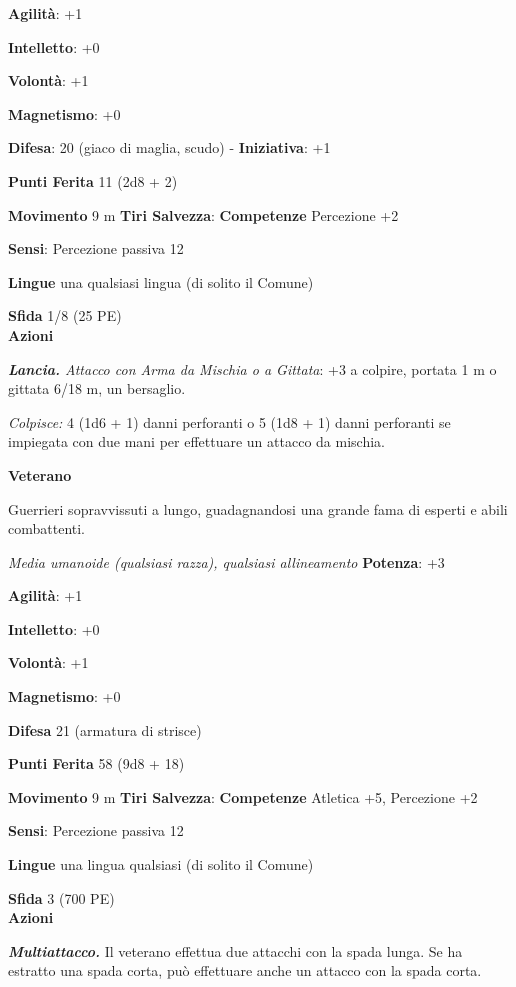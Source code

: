 \begin{multicols}{2}
\textbf{Agilità}: +1

\textbf{Intelletto}: +0

\textbf{Volontà}: +1

\textbf{Magnetismo}: +0

\textbf{Difesa}: 20 (giaco di maglia, scudo) - \textbf{Iniziativa}: +1

\textbf{Punti Ferita} 11 (2d8 + 2)

\textbf{Movimento} 9 m
\textbf{Tiri Salvezza}:
\textbf{Competenze} Percezione +2

\textbf{Sensi}: Percezione passiva 12

\textbf{Lingue} una qualsiasi lingua (di solito il Comune)

\textbf{Sfida} 1/8 (25 PE)\smallskip\\

\smallskip\textbf{Azioni}

\emph{\textbf{Lancia.} Attacco con Arma da Mischia o a Gittata}: +3 a
colpire, portata 1 m o gittata 6/18 m, un bersaglio.

\emph{Colpisce:} 4 (1d6 + 1) danni perforanti o 5 (1d8 + 1) danni
perforanti se impiegata con due mani per effettuare un attacco da
mischia.

\textbf{Veterano}

Guerrieri sopravvissuti a lungo, guadagnandosi una grande fama di
esperti e abili combattenti.

\emph{Media umanoide (qualsiasi razza), qualsiasi allineamento}
\textbf{Potenza}: +3

\textbf{Agilità}: +1

\textbf{Intelletto}: +0

\textbf{Volontà}: +1

\textbf{Magnetismo}: +0

\textbf{Difesa} 21 (armatura di strisce)

\textbf{Punti Ferita} 58 (9d8 + 18)

\textbf{Movimento} 9 m
\textbf{Tiri Salvezza}:
\textbf{Competenze} Atletica +5, Percezione +2

\textbf{Sensi}: Percezione passiva 12

\textbf{Lingue} una lingua qualsiasi (di solito il Comune)

\textbf{Sfida} 3 (700 PE)\smallskip\\

\smallskip\textbf{Azioni}

\emph{\textbf{Multiattacco.}} Il veterano effettua due attacchi con la
spada lunga. Se ha estratto una spada corta, può effettuare anche un
attacco con la spada corta.


\end{multicols}
